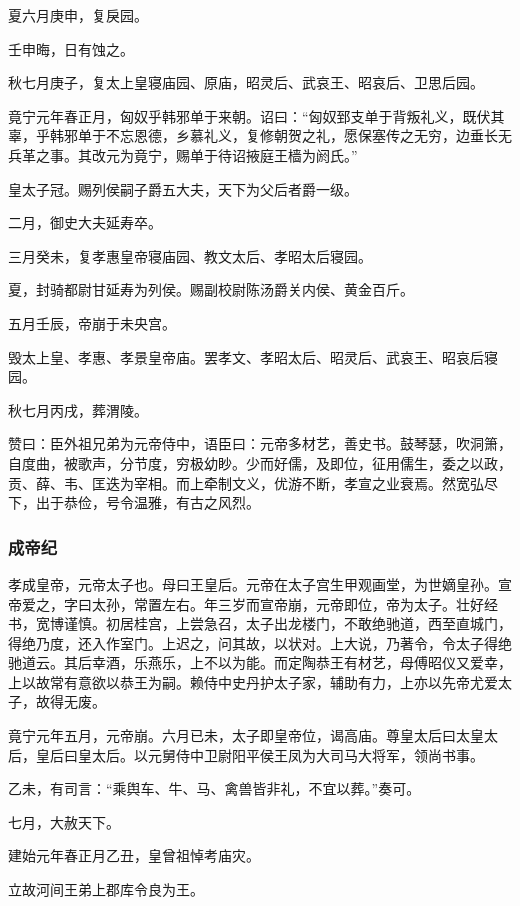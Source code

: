 \documentclass[]{article}
\begin{document}
夏六月庚申，复戾园。

壬申晦，日有蚀之。

秋七月庚子，复太上皇寝庙园、原庙，昭灵后、武哀王、昭哀后、卫思后园。

竟宁元年春正月，匈奴乎韩邪单于来朝。诏曰：``匈奴郅支单于背叛礼义，既伏其辜，乎韩邪单于不忘恩德，乡慕礼义，复修朝贺之礼，愿保塞传之无穷，边垂长无兵革之事。其改元为竟宁，赐单于待诏掖庭王樯为阏氏。''

皇太子冠。赐列侯嗣子爵五大夫，天下为父后者爵一级。

二月，御史大夫延寿卒。

三月癸未，复孝惠皇帝寝庙园、教文太后、孝昭太后寝园。

夏，封骑都尉甘延寿为列侯。赐副校尉陈汤爵关内侯、黄金百斤。

五月壬辰，帝崩于未央宫。

毁太上皇、孝惠、孝景皇帝庙。罢孝文、孝昭太后、昭灵后、武哀王、昭哀后寝园。

秋七月丙戌，葬渭陵。

赞曰：臣外祖兄弟为元帝侍中，语臣曰：元帝多材艺，善史书。鼓琴瑟，吹洞箫，自度曲，被歌声，分节度，穷极幼眇。少而好儒，及即位，征用儒生，委之以政，贡、薛、韦、匡迭为宰相。而上牵制文义，优游不断，孝宣之业衰焉。然宽弘尽下，出于恭俭，号令温雅，有古之风烈。

\hypertarget{header-n962}{%
\subsubsection{成帝纪}\label{header-n962}}

孝成皇帝，元帝太子也。母曰王皇后。元帝在太子宫生甲观画堂，为世嫡皇孙。宣帝爱之，字曰太孙，常置左右。年三岁而宣帝崩，元帝即位，帝为太子。壮好经书，宽博谨慎。初居桂宫，上尝急召，太子出龙楼门，不敢绝驰道，西至直城门，得绝乃度，还入作室门。上迟之，问其故，以状对。上大说，乃著令，令太子得绝驰道云。其后幸酒，乐燕乐，上不以为能。而定陶恭王有材艺，母傅昭仪又爱幸，上以故常有意欲以恭王为嗣。赖侍中史丹护太子家，辅助有力，上亦以先帝尤爱太子，故得无废。

竟宁元年五月，元帝崩。六月已未，太子即皇帝位，谒高庙。尊皇太后曰太皇太后，皇后曰皇太后。以元舅侍中卫尉阳平侯王凤为大司马大将军，领尚书事。

乙未，有司言：``乘舆车、牛、马、禽兽皆非礼，不宜以葬。''奏可。

七月，大赦天下。

建始元年春正月乙丑，皇曾祖悼考庙灾。

立故河间王弟上郡库令良为王。
\end{document}
